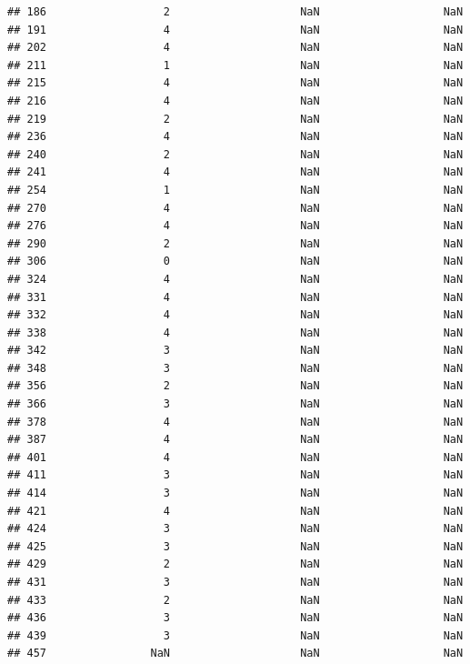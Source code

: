 \documentclass[
]{article}
\begin{document}
\begin{verbatim}
## 186                  2                    NaN                   NaN
## 191                  4                    NaN                   NaN
## 202                  4                    NaN                   NaN
## 211                  1                    NaN                   NaN
## 215                  4                    NaN                   NaN
## 216                  4                    NaN                   NaN
## 219                  2                    NaN                   NaN
## 236                  4                    NaN                   NaN
## 240                  2                    NaN                   NaN
## 241                  4                    NaN                   NaN
## 254                  1                    NaN                   NaN
## 270                  4                    NaN                   NaN
## 276                  4                    NaN                   NaN
## 290                  2                    NaN                   NaN
## 306                  0                    NaN                   NaN
## 324                  4                    NaN                   NaN
## 331                  4                    NaN                   NaN
## 332                  4                    NaN                   NaN
## 338                  4                    NaN                   NaN
## 342                  3                    NaN                   NaN
## 348                  3                    NaN                   NaN
## 356                  2                    NaN                   NaN
## 366                  3                    NaN                   NaN
## 378                  4                    NaN                   NaN
## 387                  4                    NaN                   NaN
## 401                  4                    NaN                   NaN
## 411                  3                    NaN                   NaN
## 414                  3                    NaN                   NaN
## 421                  4                    NaN                   NaN
## 424                  3                    NaN                   NaN
## 425                  3                    NaN                   NaN
## 429                  2                    NaN                   NaN
## 431                  3                    NaN                   NaN
## 433                  2                    NaN                   NaN
## 436                  3                    NaN                   NaN
## 439                  3                    NaN                   NaN
## 457                NaN                    NaN                   NaN

\end{verbatim}
\end{document}
